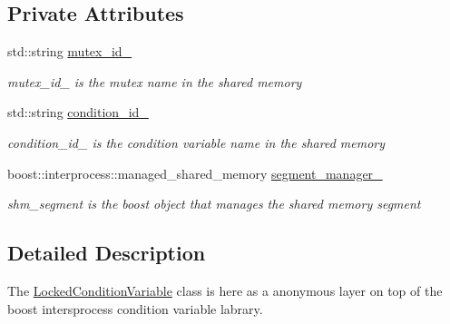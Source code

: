 \subsection*{Private Attributes}
\begin{DoxyCompactItemize}
\item 
std\+::string \hyperlink{classshared__memory_1_1LockedConditionVariable_a07d7d718e33cc2e833cf9bb22fe8fada}{mutex\+\_\+id\+\_\+}\hypertarget{classshared__memory_1_1LockedConditionVariable_a07d7d718e33cc2e833cf9bb22fe8fada}{}\label{classshared__memory_1_1LockedConditionVariable_a07d7d718e33cc2e833cf9bb22fe8fada}

\begin{DoxyCompactList}\small\item\em mutex\+\_\+id\+\_\+ is the mutex name in the shared memory \end{DoxyCompactList}\item 
std\+::string \hyperlink{classshared__memory_1_1LockedConditionVariable_a7cf01915f9d1a8795f4e69345cd1e1e4}{condition\+\_\+id\+\_\+}\hypertarget{classshared__memory_1_1LockedConditionVariable_a7cf01915f9d1a8795f4e69345cd1e1e4}{}\label{classshared__memory_1_1LockedConditionVariable_a7cf01915f9d1a8795f4e69345cd1e1e4}

\begin{DoxyCompactList}\small\item\em condition\+\_\+id\+\_\+ is the condition variable name in the shared memory \end{DoxyCompactList}\item 
boost\+::interprocess\+::managed\+\_\+shared\+\_\+memory \hyperlink{classshared__memory_1_1LockedConditionVariable_ae6a197846be3bd4ccf4899754778f16b}{segment\+\_\+manager\+\_\+}\hypertarget{classshared__memory_1_1LockedConditionVariable_ae6a197846be3bd4ccf4899754778f16b}{}\label{classshared__memory_1_1LockedConditionVariable_ae6a197846be3bd4ccf4899754778f16b}

\begin{DoxyCompactList}\small\item\em shm\+\_\+segment is the boost object that manages the shared memory segment \end{DoxyCompactList}\end{DoxyCompactItemize}


\subsection{Detailed Description}
The \hyperlink{classshared__memory_1_1LockedConditionVariable}{Locked\+Condition\+Variable} class is here as a anonymous layer on top of the boost intersprocess condition variable labrary. 


